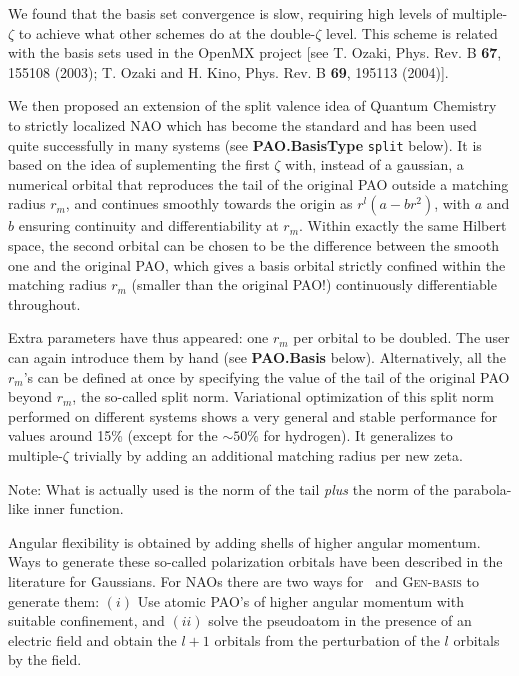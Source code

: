   We found that the basis set convergence is slow, requiring high levels
of multiple-$\zeta$ to achieve what other schemes do at the double-$\zeta$
level.
  This scheme is related with the basis sets used in the OpenMX project
[see T. Ozaki, Phys. Rev. B \textbf{67}, 155108 (2003); T. Ozaki and H. Kino,
Phys. Rev. B \textbf{69}, 195113 (2004)].

  We then proposed an extension of the split valence idea of Quantum Chemistry
to strictly localized NAO which has become the standard and has been used
quite successfully in many systems (see \textbf{PAO.BasisType} \texttt{split} below).
  It is based on the idea of suplementing the first $\zeta$ with, instead of
a gaussian, a numerical orbital that reproduces the tail of the original PAO
outside a matching radius $r_{m}$, and continues smoothly towards the origin as
$r^l(a-br^2)$, with $a$ and $b$ ensuring continuity and differentiability
at $r_{m}$.
  Within exactly the same
Hilbert space, the second orbital can be chosen to be the difference between
the smooth one and the original PAO, which gives a basis orbital strictly
confined within the matching radius $r_{m}$ (smaller than the
original PAO!) continuously differentiable throughout.

  Extra parameters have thus appeared: one $r_m$ per orbital to be doubled.
The user can again introduce them by hand (see \textbf{PAO.Basis} below).
Alternatively, all the $r_m$'s can be defined at once by specifying
the value of the tail of the original PAO beyond $r_m$, the so-called
split norm. Variational optimization
of this split norm performed on different systems
shows a very general and stable performance for values around
15\% (except for the $\sim 50\%$ for hydrogen).
  It generalizes to multiple-$\zeta$ trivially by adding an additional
matching radius per new zeta.

Note: What is actually used is the norm of the tail {\em plus} the
norm of the parabola-like inner function.

Angular flexibility is obtained by adding shells of higher angular
momentum.  Ways to generate these so-called polarization orbitals have
been described in the literature for Gaussians.  For NAOs there are
two ways for \siesta\ and \textsc{Gen-basis} to generate them: $(i)$
Use atomic PAO's of higher angular momentum with suitable confinement,
and $(ii)$ solve the pseudoatom in the presence of an electric field
and obtain the $l+1$ orbitals from the perturbation of the $l$
orbitals by the field.

